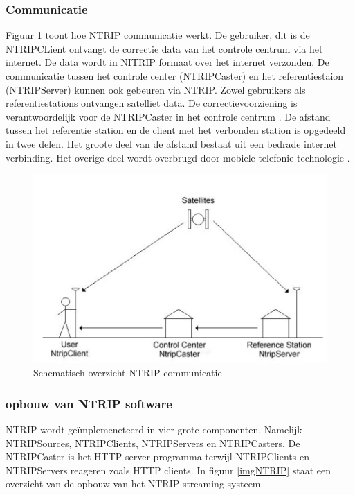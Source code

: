 \subsubsection{Communicatie}
Figuur \ref{imgNTRIPCom} toont hoe NTRIP communicatie werkt. De gebruiker, dit is de NTRIPCLient ontvangt de correctie data van het controle centrum via het internet. De data wordt in NITRIP formaat over het internet verzonden. De communicatie tussen het controle center (NTRIPCaster) en het referentiestaion (NTRIPServer) kunnen ook gebeuren via NTRIP. Zowel gebruikers als referentiestations ontvangen satelliet data. De correctievoorziening is verantwoordelijk voor de NTRIPCaster in het controle centrum \cite{LBibNTRIP4}. De afstand tussen het referentie station en de client met het verbonden station is opgedeeld in twee delen. Het groote deel van de afstand bestaat uit een bedrade internet verbinding. Het overige deel wordt overbrugd door mobiele telefonie technologie \cite{LBibNTRIP2}.

\begin{figure}[hpb]
	\includegraphics[scale=0.55]{NTRIPCommunication.png}
	\caption{Schematisch overzicht NTRIP communicatie \cite{LBibNTRIP4}}
	\label{imgNTRIPCom}
\end{figure}

\subsubsection{opbouw van NTRIP software}
\label{LONS}
NTRIP wordt ge\"implemeneteerd in vier grote componenten. Namelijk NTRIPSources, NTRIPClients, NTRIPServers en NTRIPCasters. De NTRIPCaster is het HTTP server programma terwijl NTRIPClients en NTRIPServers reageren zoals HTTP clients\cite{LBibNTRIP}.  In figuur \ref{imgNTRIP} staat een overzicht van de opbouw van het NTRIP streaming systeem.

